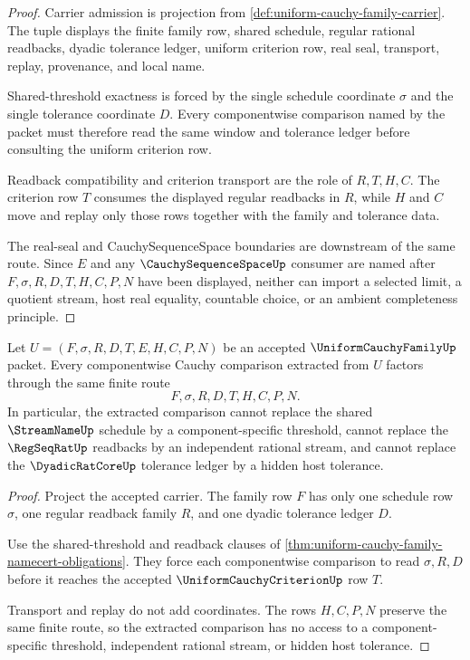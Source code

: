 \begin{proof}
Carrier admission is projection from \autoref{def:uniform-cauchy-family-carrier}. The tuple displays the finite family row, shared schedule, regular rational readbacks, dyadic tolerance ledger, uniform criterion row, real seal, transport, replay, provenance, and local name.

Shared-threshold exactness is forced by the single schedule coordinate $\sigma$ and the single tolerance coordinate $D$. Every componentwise comparison named by the packet must therefore read the same window and tolerance ledger before consulting the uniform criterion row.

Readback compatibility and criterion transport are the role of $R,T,H,C$. The criterion row $T$ consumes the displayed regular readbacks in $R$, while $H$ and $C$ move and replay only those rows together with the family and tolerance data.

The real-seal and CauchySequenceSpace boundaries are downstream of the same route. Since $E$ and any $\CauchySequenceSpaceUp$ consumer are named after $F,\sigma,R,D,T,H,C,P,N$ have been displayed, neither can import a selected limit, a quotient stream, host real equality, countable choice, or an ambient completeness principle.
\end{proof}

\begin{theorem}
\label{thm:uniform-cauchy-family-common-window-extraction}
Let $U=(F,\sigma,R,D,T,E,H,C,P,N)$ be an accepted $\UniformCauchyFamilyUp$ packet. Every componentwise Cauchy comparison extracted from $U$ factors through the same finite route
$$
F,\sigma,R,D,T,H,C,P,N.
$$
In particular, the extracted comparison cannot replace the shared $\StreamNameUp$ schedule by a component-specific threshold, cannot replace the $\RegSeqRatUp$ readbacks by an independent rational stream, and cannot replace the $\DyadicRatCoreUp$ tolerance ledger by a hidden host tolerance.
\end{theorem}
\begin{proof}
Project the accepted carrier. The family row $F$ has only one schedule row $\sigma$, one regular readback family $R$, and one dyadic tolerance ledger $D$.

Use the shared-threshold and readback clauses of \autoref{thm:uniform-cauchy-family-namecert-obligations}. They force each componentwise comparison to read $\sigma,R,D$ before it reaches the accepted $\UniformCauchyCriterionUp$ row $T$.

Transport and replay do not add coordinates. The rows $H,C,P,N$ preserve the same finite route, so the extracted comparison has no access to a component-specific threshold, independent rational stream, or hidden host tolerance.
\end{proof}

